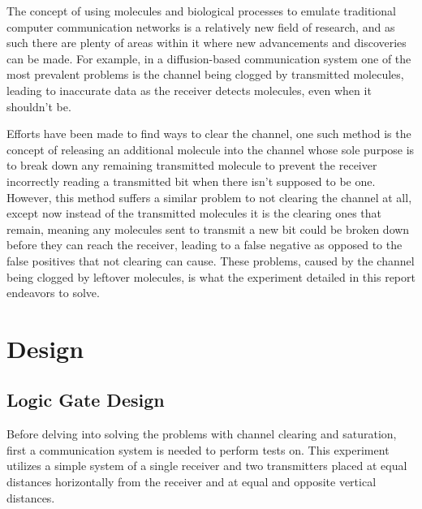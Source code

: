 \documentclass[conference]{IEEEtran}
\begin{document}
The concept of using molecules and biological processes to emulate traditional computer communication networks is a relatively new field of research, and as such there are plenty of areas within it where new advancements and discoveries can be made. For example, in a diffusion-based communication system one of the most prevalent problems is the channel being clogged by transmitted molecules, leading to inaccurate data as the receiver detects molecules, even when it shouldn’t be.
\\
\par
Efforts have been made to find ways to clear the channel, one such method is the concept of releasing an additional molecule into the channel whose sole purpose is to break down any remaining transmitted molecule to prevent the receiver incorrectly reading a transmitted bit when there isn’t supposed to be one. However, this method suffers a similar problem to not clearing the channel at all, except now instead of the transmitted molecules it is the clearing ones that remain, meaning any molecules sent to transmit a new bit could be broken down before they can reach the receiver, leading to a false negative as opposed to the false positives that not clearing can cause. These problems, caused by the channel being clogged by leftover molecules, is what the experiment detailed in this report endeavors to solve.

\section{Design}

\subsection{Logic Gate Design}
Before delving into solving the problems with channel clearing and saturation, first a communication system is needed to perform tests on. This experiment utilizes a simple system of a single receiver and two transmitters placed at equal distances horizontally from the receiver and at equal and opposite vertical distances.
\end{document}
